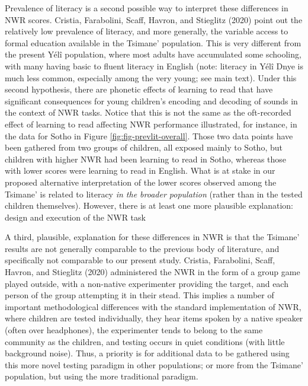 \documentclass[
  american,
  ,doc,floatsintext]{apa6}
\begin{document}
Prevalence of literacy is a second possible way to interpret these differences in NWR scores. Cristia, Farabolini, Scaff, Havron, and Stieglitz (2020) point out the relatively low prevalence of literacy, and more generally, the variable access to formal education available in the Tsimane' population. This is very different from the present Yélî population, where most adults have accumulated some schooling, with many having basic to fluent literacy in English (note: literacy in Yélî Dnye is much less common, especially among the very young; see main text). Under this second hypothesis, there are phonetic effects of learning to read that have significant consequences for young children's encoding and decoding of sounds in the context of NWR tasks. Notice that this is not the same as the oft-recorded effect of learning to read affecting NWR performance illustrated, for instance, in the data for Sotho in Figure \ref{fig:fig-prevlit-overall}. Those two data points have been gathered from two groups of children, all exposed mainly to Sotho, but children with higher NWR had been learning to read in Sotho, whereas those with lower scores were learning to read in English. What is at stake in our proposed alternative interpretation of the lower scores observed among the Tsimane' is related to literacy \emph{in the broader population} (rather than in the tested children themselves). However, there is at least one more plausible explanation: design and execution of the NWR task

A third, plausible, explanation for these differences in NWR is that the Tsimane' results are not generally comparable to the previous body of literature, and specifically not comparable to our present study. Cristia, Farabolini, Scaff, Havron, and Stieglitz (2020) administered the NWR in the form of a group game played outside, with a non-native experimenter providing the target, and each person of the group attempting it in their stead. This implies a number of important methodological differences with the standard implementation of NWR, where children are tested individually, they hear items spoken by a native speaker (often over headphones), the experimenter tends to belong to the same community as the children, and testing occurs in quiet conditions (with little background noise). Thus, a priority is for additional data to be gathered using this more novel testing paradigm in other populations; or more from the Tsimane' population, but using the more traditional paradigm.
\end{document}
